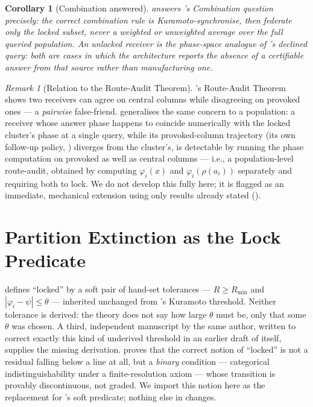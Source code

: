 \documentclass[11pt,twocolumn,a4paper]{article}
\theoremstyle{rdm}
\newtheorem{corollary}[theorem]{Corollary}
\theoremstyle{definition}
\theoremstyle{remark}
\newtheorem{remark}[theorem]{Remark}
\begin{document}
\begin{corollary}[Combination answered]
\label{cor:combination}
 answers 's Combination question
precisely: the correct combination rule is \emph{Kuramoto-synchronise, then
federate only the locked subset}, never a weighted or unweighted average
over the full queried population. An unlocked receiver is the phase-space
analogue of 's declined query: both are cases in which
the architecture reports the absence of a certifiable answer from that
source rather than manufacturing one.
\end{corollary}

\begin{remark}[Relation to the Route-Audit Theorem]
\label{rem:route-audit-relation}
\citet[Thm.~8.3]{sachikonye-accountable-compilation}'s Route-Audit Theorem
shows two receivers can agree on central columns while disagreeing on
provoked ones — a \emph{pairwise} false-friend. 
generalises the same concern to a population: a receiver whose answer phase
happens to coincide numerically with the locked cluster's phase at a single
query, while its provoked-column trajectory (its own follow-up policy,
) diverges from the cluster's, is detectable by
running the phase computation on provoked as well as central columns —
i.e., a population-level route-audit, obtained by computing
$\varphi_i(x)$ and $\varphi_i(\rho(a_i))$ separately and requiring both to
lock. We do not develop this fully here; it is flagged as an immediate,
mechanical extension using only results already stated
().
\end{remark}

\section{Partition Extinction as the Lock Predicate}
\label{sec:extinction}

 defines ``locked'' by a soft pair of hand-set
tolerances — $R\ge R_{\min}$ and $|\varphi_i-\psi|\le\theta$ — inherited
unchanged from \citet[Thm.~10.3]{sachikonye-split-attention}'s Kuramoto
threshold. Neither tolerance is derived: the theory does not say how large
$\theta$ must be, only that some $\theta$ was chosen. A third, independent
manuscript by the same author, written to correct exactly this kind of
underived threshold in an earlier draft of itself, supplies the missing
derivation. \citet{sachikonye-coordination-regimes} proves that the correct
notion of ``locked'' is not a residual falling below a line at all, but a
\emph{binary} condition — categorical indistinguishability under a
finite-resolution axiom — whose transition is provably discontinuous,
not graded. We import this notion here as the replacement for
's soft predicate; nothing else in
 changes.
\end{document}
